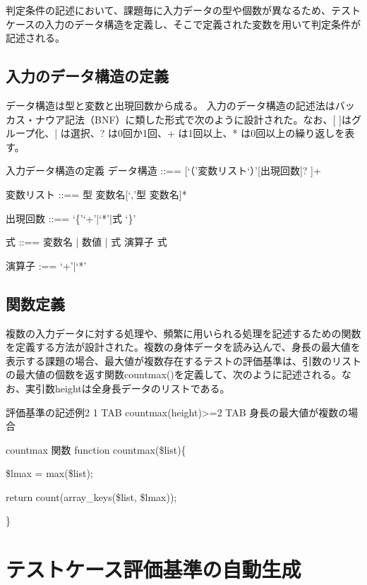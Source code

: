 \documentclass{tpu-sotu}
\begin{document}
判定条件の記述において、課題毎に入力データの型や個数が異なるため、テストケースの入力のデータ構造を定義し、そこで定義された変数を用いて判定条件が記述される。
\section{入力のデータ構造の定義}
データ構造は型と変数と出現回数から成る。
入力のデータ構造の記述法はバッカス・ナウア記法（BNF）に類した形式で次のように設計された。なお、[ ]はグループ化、| は選択、? は0回か1回、+ は1回以上、* は0回以上の繰り返しを表す。

\begin{minipage}[b]{.7\textwidth}
\begin{itembox}[l]{入力データ構造の定義}
データ構造 ::== [‘（’変数リスト‘）’[出現回数]? ]+

変数リスト ::== 型 変数名[‘,’型 変数名]*

出現回数 ::== ‘\{’‘+’|‘*’|式 ‘\}’

式 ::== 変数名 | 数値 | 式 演算子 式

演算子 :== ‘+’|‘*’
\end{itembox}
\end{minipage}
\section{関数定義}
複数の入力データに対する処理や、頻繁に用いられる処理を記述するための関数を定義する方法が設計された。複数の身体データを読み込んで、身長の最大値を表示する課題の場合、最大値が複数存在するテストの評価基準は、引数のリストの最大値の個数を返す関数countmax()を定義して、次のように記述される。なお、実引数heightは全身長データのリストである。
\begin{itembox}[l]{評価基準の記述例2}
1 TAB countmax(height)>=2 TAB 身長の最大値が複数の場合
\end{itembox}
\begin{minipage}[b]{.7\textwidth}
\begin{itembox}[l]{countmax 関数}
function countmax(\$list)\{

\hspace{15pt}\$lmax = max(\$list);

\hspace{15pt}return count(array\_keys(\$list, \$lmax));

\}
\end{itembox}
\end{minipage}


\chapter{テストケース評価基準の自動生成}
\end{document}
